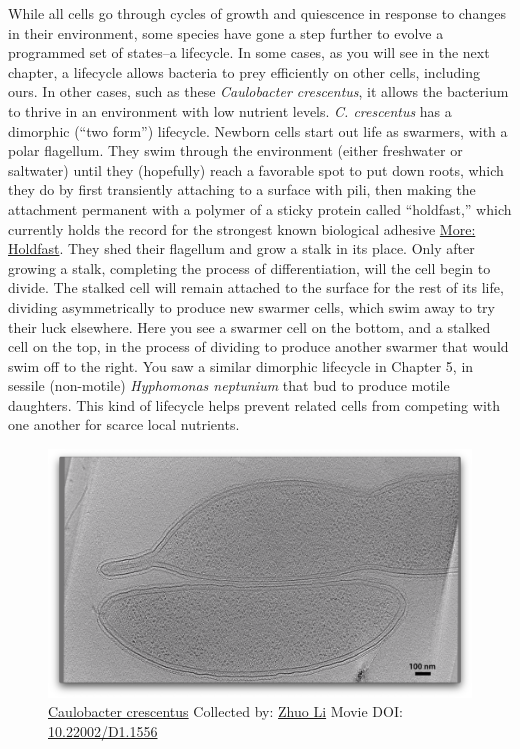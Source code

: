 \documentclass[]{tufte-book}
\begin{document}
While all cells go through cycles of growth and quiescence in response
to changes in their environment, some species have gone a step further
to evolve a programmed set of states--a lifecycle. In some cases, as you
will see in the next chapter, a lifecycle allows bacteria to prey
efficiently on other cells, including ours. In other cases, such as
these \emph{Caulobacter crescentus}, it allows the bacterium to thrive
in an environment with low nutrient levels. \emph{C. crescentus} has a
dimorphic (``two form'') lifecycle. Newborn cells start out life as
swarmers, with a polar flagellum. They swim through the environment
(either freshwater or saltwater) until they (hopefully) reach a
favorable spot to put down roots, which they do by first transiently
attaching to a surface with pili, then making the attachment permanent
with a polymer of a sticky protein called ``holdfast,'' which currently
holds the record for the strongest known biological adhesive
\protect\hyperlink{Holdfast}{More: Holdfast}. They shed their flagellum
and grow a stalk in its place. Only after growing a stalk, completing
the process of differentiation, will the cell begin to divide. The
stalked cell will remain attached to the surface for the rest of its
life, dividing asymmetrically to produce new swarmer cells, which swim
away to try their luck elsewhere. Here you see a swarmer cell on the
bottom, and a stalked cell on the top, in the process of dividing to
produce another swarmer that would swim off to the right. You saw a
similar dimorphic lifecycle in Chapter 5, in sessile (non-motile)
\emph{Hyphomonas neptunium} that bud to produce motile daughters. This
kind of lifecycle helps prevent related cells from competing with one
another for scarce local nutrients.





\begin{figure}
\includegraphics{movie_stills/8_4} \caption[\protect\hyperlink{tree}{Caulobacter crescentus} Collected by:
\protect\hyperlink{zhuo_li}{Zhuo Li} Movie DOI:
\href{https://doi.org/10.22002/D1.1556}{10.22002/D1.1556}]{\protect\hyperlink{tree}{Caulobacter crescentus} Collected by:
\protect\hyperlink{zhuo_li}{Zhuo Li} Movie DOI:
\href{https://doi.org/10.22002/D1.1556}{10.22002/D1.1556}}\label{fig:8-4}
\end{figure}
\end{document}
